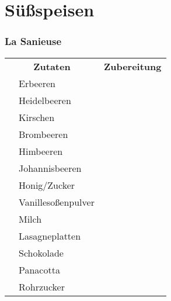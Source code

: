 
\part{Süßspeisen}
	\section{La Sanieuse}
			\begin{tabular}{lll}
				\multicolumn{2}{c}{\Large \textbf{Zutaten}}&\multicolumn{1}{c}{\Large \textbf{Zubereitung}}\\
				&Erbeeren\\
				&Heidelbeeren\\
				&Kirschen\\
				&Brombeeren\\
				&Himbeeren\\
				&Johannisbeeren\\
				&Honig/Zucker\\
				&Vanillesoßenpulver\\
				&Milch\\
				&Lasagneplatten\\
				&Schokolade\\
				&Panacotta\\
				&Rohrzucker\\
			\end{tabular}\\
			
			